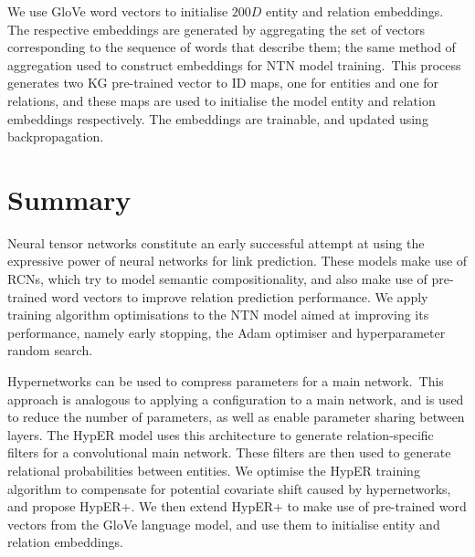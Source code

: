 \noindent We use GloVe word vectors to initialise $ 200D $ entity and relation embeddings. The respective embeddings are generated by aggregating the set of vectors corresponding to the sequence of words that describe them; the same method of aggregation used to construct embeddings for NTN model training.\ This process generates two KG pre-trained vector to ID maps, one for entities and one for relations, and these maps are used to initialise the model entity and relation embeddings respectively. The embeddings are trainable, and updated using backpropagation. 



\section{Summary}

Neural tensor networks constitute an early successful attempt at using the expressive power of neural networks for link prediction. These models make use of RCNs, which try to model semantic compositionality, and also make use of pre-trained word vectors to improve relation prediction performance. We apply training algorithm optimisations to the NTN model aimed at improving its performance, namely early stopping, the Adam optimiser and hyperparameter random search. \par

\noindent Hypernetworks can be used to compress parameters for a main network.\ This approach is analogous to applying a configuration to a main network, and is used to reduce the number of parameters, as well as enable parameter sharing between layers. The HypER model uses this architecture to generate relation-specific filters for a convolutional main network. These filters are then used to generate relational probabilities between entities. We optimise the HypER training algorithm to compensate for potential covariate shift caused by hypernetworks, and propose HypER+. We then extend HypER+ to make use of pre-trained word vectors from the GloVe language model, and use them to initialise entity and relation embeddings. 
